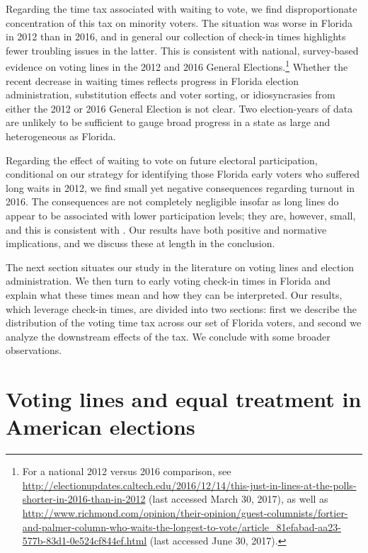 \documentclass[12pt,titlepage]{article}
\begin{document}
Regarding the time tax associated with waiting to vote, we find
disproportionate concentration of this tax on minority voters.  The
situation was worse in Florida in 2012 than in 2016, and in general
our collection of check-in times highlights fewer troubling issues in
the latter.  This is consistent with national, survey-based evidence
on voting lines in the 2012 and 2016 General Elections.\footnote{For a
  national 2012 versus 2016 comparison, see
  \url{http://electionupdates.caltech.edu/2016/12/14/this-just-in-lines-at-the-polls-shorter-in-2016-than-in-2012}
  (last accessed March 30, 2017), as well as
  \url{http://www.richmond.com/opinion/their-opinion/guest-columnists/fortier-and-palmer-column-who-waits-the-longest-to-vote/article_81efabad-aa23-577b-83d1-0e524cf844ef.html}
  (last accessed June 30, 2017).}  Whether the recent decrease in
waiting times reflects progress in Florida election administration,
substitution effects and voter sorting, or idiosyncrasies from either
the 2012 or 2016 General Election is not clear.  Two election-years of
data are unlikely to be sufficient to gauge broad progress in a state
as large and heterogeneous as Florida.

Regarding the effect of waiting to vote on future electoral
participation, conditional on our strategy for identifying those
Florida early voters who suffered long waits in 2012, we find small
yet negative consequences regarding turnout in 2016. The consequences
are not completely negligible insofar as long lines do appear to be
associated with lower participation levels; they are, however, small,
and this is consistent with
\citet{pettigrew:longlinesminorityprecincts}.  Our results have both
positive and normative implications, and we discuss these at length in
the conclusion.

The next section situates our study in the literature on voting lines
and election administration.  We then turn to early voting check-in
times in Florida and explain what these times mean and how they can be
interpreted.  Our results, which leverage check-in times, are divided
into two sections: first we describe the distribution of the voting
time tax across our set of Florida voters, and second we analyze the
downstream effects of the tax.  We conclude with some broader
observations.

\section*{Voting lines and equal treatment in American elections}
\end{document}
